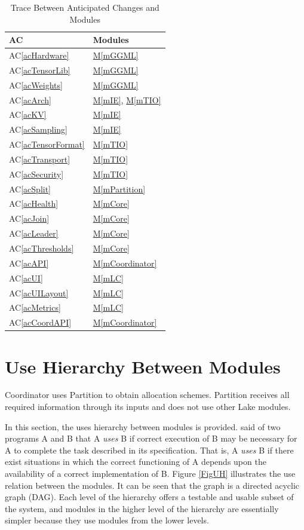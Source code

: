 \documentclass[12pt, titlepage]{article}
\newcommand{\acref}[1]{AC\ref{#1}}
\newcommand{\mref}[1]{\hyperref[sec:#1]{M\ref*{#1}}}
\begin{document}
\begin{table}[H]
\centering
\begin{tabular}{p{} p{}}
\toprule
\textbf{AC} & \textbf{Modules}\\
\midrule
\acref{acHardware} & \mref{mGGML}\\
\acref{acTensorLib} & \mref{mGGML}\\
\acref{acWeights} & \mref{mGGML}\\
\acref{acArch} & \mref{mIE}, \mref{mTIO}\\
\acref{acKV} & \mref{mIE}\\
\acref{acSampling} & \mref{mIE}\\
\acref{acTensorFormat} & \mref{mTIO}\\
\acref{acTransport} & \mref{mTIO}\\
\acref{acSecurity} & \mref{mTIO}\\
\acref{acSplit} & \mref{mPartition}\\
\acref{acHealth} & \mref{mCore}\\
\acref{acJoin} & \mref{mCore}\\
\acref{acLeader} & \mref{mCore}\\
\acref{acThresholds} & \mref{mCore}\\
\acref{acAPI} & \mref{mCoordinator}\\
\acref{acUI} & \mref{mLC}\\
\acref{acUILayout} & \mref{mLC}\\
\acref{acMetrics} & \mref{mLC}\\
\acref{acCoordAPI} & \mref{mCoordinator}\\
\bottomrule
\end{tabular}
\caption{Trace Between Anticipated Changes and Modules}
\label{TblACT}
\end{table}

\section{Use Hierarchy Between Modules} \label{SecUse}

Coordinator uses Partition to obtain allocation schemes. Partition receives
all required information through its inputs and does not use other Lake modules.

In this section, the uses hierarchy between modules is
provided. \citet{Parnas1978} said of two programs A and B that A {\em uses} B if
correct execution of B may be necessary for A to complete the task described in
its specification. That is, A {\em uses} B if there exist situations in which
the correct functioning of A depends upon the availability of a correct
implementation of B.  Figure \ref{FigUH} illustrates the use relation between
the modules. It can be seen that the graph is a directed acyclic graph
(DAG). Each level of the hierarchy offers a testable and usable subset of the
system, and modules in the higher level of the hierarchy are essentially simpler
because they use modules from the lower levels.
\end{document}

